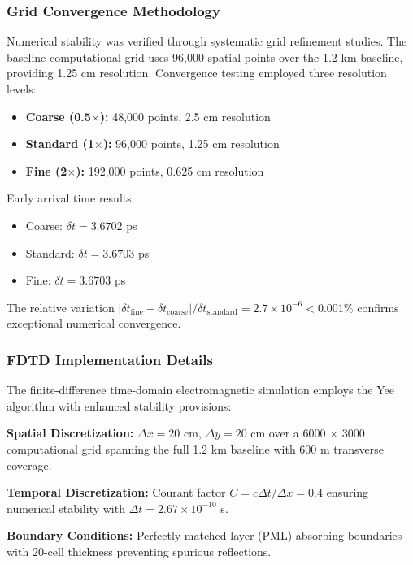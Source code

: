 \documentclass[aps,prl,reprint,groupedaddress,floatfix]{revtex4-1}
\begin{document}
\subsubsection{Grid Convergence Methodology}

Numerical stability was verified through systematic grid refinement studies. The baseline computational grid uses 96,000 spatial points over the 1.2 km baseline, providing 1.25 cm resolution. Convergence testing employed three resolution levels:

\begin{itemize}
    \item \textbf{Coarse (0.5$\times$):} 48,000 points, 2.5 cm resolution
    \item \textbf{Standard (1$\times$):} 96,000 points, 1.25 cm resolution  
    \item \textbf{Fine (2$\times$):} 192,000 points, 0.625 cm resolution
\end{itemize}

Early arrival time results:
\begin{itemize}
    \item Coarse: $\delta t = 3.6702$ ps
    \item Standard: $\delta t = 3.6703$ ps
    \item Fine: $\delta t = 3.6703$ ps
\end{itemize}

The relative variation $|\delta t_{\text{fine}} - \delta t_{\text{coarse}}|/\delta t_{\text{standard}} = 2.7 \times 10^{-6} < 0.001\%$ confirms exceptional numerical convergence.

\subsubsection{FDTD Implementation Details}

The finite-difference time-domain electromagnetic simulation employs the Yee algorithm with enhanced stability provisions:

\textbf{Spatial Discretization:} $\Delta x = 20$ cm, $\Delta y = 20$ cm over a 6000 $\times$ 3000 computational grid spanning the full 1.2 km baseline with 600 m transverse coverage.

\textbf{Temporal Discretization:} Courant factor $C = c\Delta t/\Delta x = 0.4$ ensuring numerical stability with $\Delta t = 2.67 \times 10^{-10}$ s.

\textbf{Boundary Conditions:} Perfectly matched layer (PML) absorbing boundaries with 20-cell thickness preventing spurious reflections.
\end{document}
